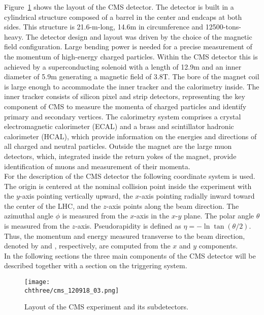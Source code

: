 Figure~\ref{fig:CMSlayout} shows the layout of the CMS detector. The detector is built in a cylindrical structure composed of a barrel in the center and endcaps at both sides. This structure is 21.6-m-long, 14.6\unit{m} in circumference and 12500-tons-heavy. The detector design and layout was driven by the choice of the magnetic field configuration. Large bending power is needed for a precise measurement of the momentum of high-energy charged particles. Within the CMS detector this is achieved by a superconducting solenoid with a length of 12.9\unit{m} and an inner diameter of 5.9\unit{m} generating a magnetic field of 3.8\unit{T}. The bore of the magnet coil is large enough to accommodate the inner tracker and the calorimetry inside. 
The inner tracker consists of silicon pixel and strip detectors, representing the key component of CMS to measure the momenta of charged particles and identify primary and secondary vertices. The calorimetry system comprises a crystal electromagnetic calorimeter (ECAL) and a brass and scintillator hadronic calorimeter (HCAL), which provide information on the energies and directions of all charged and neutral particles. Outside the magnet are the large muon detectors, which, integrated inside the return yokes of the magnet, provide identification of muons and measurement of their momenta.\\

For the description of the CMS detector the following coordinate system is used. The origin is centered at the nominal collision point inside the experiment with the $y$-axis pointing vertically upward, the $x$-axis pointing radially inward toward the center of the LHC, and the $z$-axis points along the beam direction. The azimuthal angle $\phi$ is measured from the $x$-axis in the $x$-$y$ plane. The polar angle $\theta$ is measured from the $z$-axis. Pseudorapidity is defined as $\eta = -\ln\tan(\theta/2)$. Thus, the momentum and energy measured transverse to the beam direction, denoted by \PT and \ET, respectively, are computed from the $x$ and $y$ components.\\

In the following sections the three main components of the CMS detector will be described together with a section on the triggering system.

\begin{figure}[!htb]
 \begin{center}
  \texttt{[image: \\chthree/cms\_120918\_03.png]}
 \end{center}
 \caption{Layout of the CMS experiment and its subdetectors.}
 \label{fig:CMSlayout}
\end{figure}

